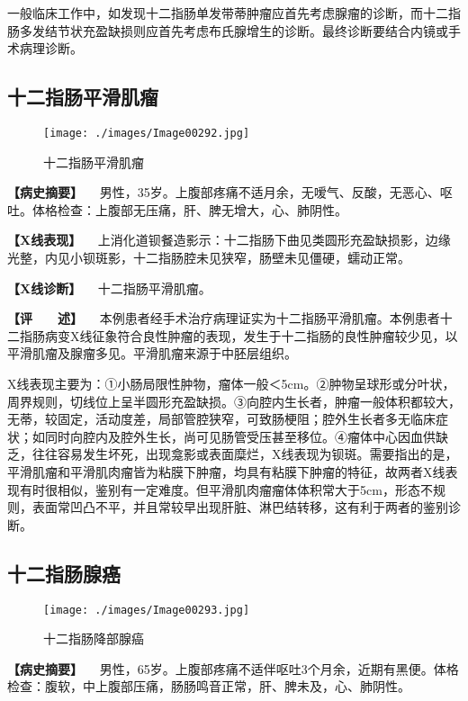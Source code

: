一般临床工作中，如发现十二指肠单发带蒂肿瘤应首先考虑腺瘤的诊断，而十二指肠多发结节状充盈缺损则应首先考虑布氏腺增生的诊断。最终诊断要结合内镜或手术病理诊断。

\subsection{十二指肠平滑肌瘤}

\begin{figure}[!htbp]
 \centering
 \texttt{[image: ./images/Image00292.jpg]}
 \captionsetup{justification=centering}
 \caption{十二指肠平滑肌瘤}
 \label{fig5-4-6}
  \end{figure} 

\textbf{【病史摘要】}
　男性，35岁。上腹部疼痛不适月余，无嗳气、反酸，无恶心、呕吐。体格检查：上腹部无压痛，肝、脾无增大，心、肺阴性。

\textbf{【X线表现】}
　上消化道钡餐造影示：十二指肠下曲见类圆形充盈缺损影，边缘光整，内见小钡斑影，十二指肠腔未见狭窄，肠壁未见僵硬，蠕动正常。

\textbf{【X线诊断】} 　十二指肠平滑肌瘤。

\textbf{【评　　述】}
　本例患者经手术治疗病理证实为十二指肠平滑肌瘤。本例患者十二指肠病变X线征象符合良性肿瘤的表现，发生于十二指肠的良性肿瘤较少见，以平滑肌瘤及腺瘤多见。平滑肌瘤来源于中胚层组织。

X线表现主要为：①小肠局限性肿物，瘤体一般＜5cm。②肿物呈球形或分叶状，周界规则，切线位上呈半圆形充盈缺损。③向腔内生长者，肿瘤一般体积都较大，无蒂，较固定，活动度差，局部管腔狭窄，可致肠梗阻；腔外生长者多无临床症状；如同时向腔内及腔外生长，尚可见肠管受压甚至移位。④瘤体中心因血供缺乏，往往容易发生坏死，出现龛影或表面糜烂，X线表现为钡斑。需要指出的是，平滑肌瘤和平滑肌肉瘤皆为粘膜下肿瘤，均具有粘膜下肿瘤的特征，故两者X线表现有时很相似，鉴别有一定难度。但平滑肌肉瘤瘤体体积常大于5cm，形态不规则，表面常凹凸不平，并且常较早出现肝脏、淋巴结转移，这有利于两者的鉴别诊断。

\subsection{十二指肠腺癌}

\begin{figure}[!htbp]
 \centering
 \texttt{[image: ./images/Image00293.jpg]}
 \captionsetup{justification=centering}
 \caption{十二指肠降部腺癌}
 \label{fig5-4-7}
  \end{figure} 

\textbf{【病史摘要】}
　男性，65岁。上腹部疼痛不适伴呕吐3个月余，近期有黑便。体格检查：腹软，中上腹部压痛，肠肠鸣音正常，肝、脾未及，心、肺阴性。

